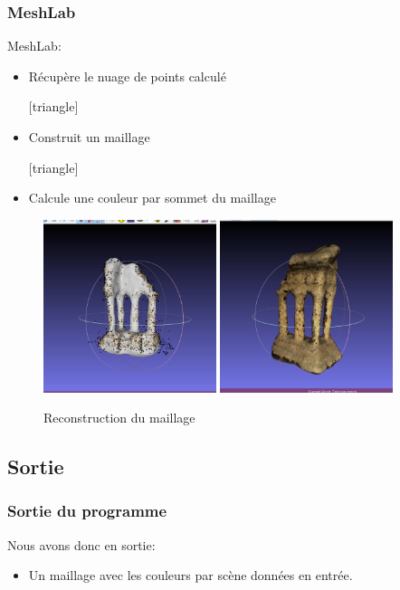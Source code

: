 	  \begin{frame}
	  \frametitle{MeshLab}
	    MeshLab:
	  \begin{itemize}
	    [triangle]
	    \item Récupère le nuage de points calculé
	    
	    [triangle]
	    \item Construit un maillage
	    
	    [triangle]
	    \item Calcule une couleur par sommet du maillage
	    \end{itemize}
	    
  \begin{figure}
  \includegraphics[width=0.45\textwidth]{Fig/nuagePtsTemple6coup.png}
  \includegraphics[width=0.45\textwidth]{Fig/nuagePtsTemple8coup.png}
  \caption{Reconstruction du maillage}
  \end{figure}
  
	 \end{frame}

	 \subsection{Sortie}
	 \begin{frame}
	  \frametitle{Sortie du programme}
	   Nous avons donc en sortie:
	  \begin{itemize}
	    [triangle]
	    \item Un maillage avec les couleurs par scène données en entrée.
	    
	    
	    \end{itemize}
	 \end{frame}

